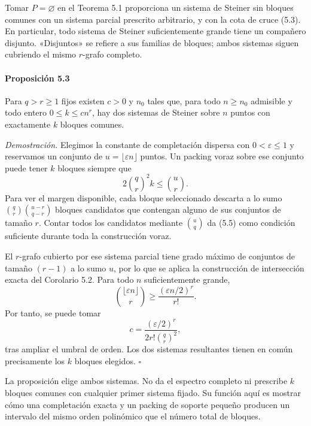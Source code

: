 \documentclass[spanish,11pt,a4paper]{article}
\begin{document}
Tomar \(P=\varnothing\) en el Teorema 5.1 proporciona un sistema de Steiner sin bloques comunes con un sistema parcial prescrito arbitrario, y con la cota de cruce (5.3). En particular, todo sistema de Steiner suficientemente grande tiene un compañero disjunto. «Disjuntos» se refiere a sus familias de bloques; ambos sistemas siguen cubriendo el mismo \(r\)-grafo completo.

\par
\begin{samepage}
\paragraph{Proposición 5.3}\label{proposiciuxf3n-5.3}

Para \(q>r\ge1\) fijos existen \(c>0\) y \(n_0\) tales que, para todo \(n\ge n_0\) admisible y todo entero \(0\le k\le c n^r\), hay dos sistemas de Steiner sobre \(n\) puntos con exactamente \(k\) bloques comunes.

\end{samepage}
\emph{Demostración.} Elegimos la constante de completación dispersa con \(0<\varepsilon\le1\) y reservamos un conjunto de \(u=\lfloor\varepsilon n\rfloor\) puntos. Un packing voraz sobre ese conjunto puede tener \(k\) bloques siempre que \[2\binom qr^2 k\le\binom ur.
\tag{5.5}\] Para ver el margen disponible, cada bloque seleccionado descarta a lo sumo \(\binom qr\binom{u-r}{q-r}\) bloques candidatos que contengan alguno de sus conjuntos de tamaño \(r\). Contar todos los candidatos mediante \(\binom uq\) da (5.5) como condición suficiente durante toda la construcción voraz.

El \(r\)-grafo cubierto por ese sistema parcial tiene grado máximo de conjuntos de tamaño \((r-1)\) a lo sumo \(u\), por lo que se aplica la construcción de intersección exacta del Corolario 5.2. Para todo \(n\) suficientemente grande, \[\binom{\lfloor\varepsilon n\rfloor}{r}
\ge\frac{(\varepsilon n/2)^r}{r!}.\] Por tanto, se puede tomar \[c=\frac{(\varepsilon/2)^r}{2r!\binom qr^2},
\tag{5.6}\] tras ampliar el umbral de orden. Los dos sistemas resultantes tienen en común precisamente los \(k\) bloques elegidos. \(\square\)

La proposición elige ambos sistemas. No da el espectro completo ni prescribe \(k\) bloques comunes con cualquier primer sistema fijado. Su función aquí es mostrar cómo una completación exacta y un packing de soporte pequeño producen un intervalo del mismo orden polinómico que el número total de bloques.
\end{document}
